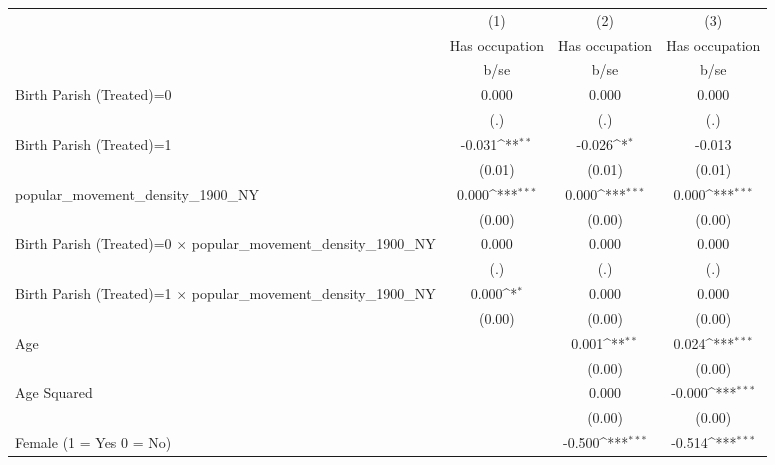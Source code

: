 {
\def\sym#1{\ifmmode^{#1}\else\(^{#1}\)\fi}
\begin{tabular}{l*{3}{c}}
\hline\hline
                    &\multicolumn{1}{c}{(1)}&\multicolumn{1}{c}{(2)}&\multicolumn{1}{c}{(3)}\\
                    &\multicolumn{1}{c}{Has occupation}&\multicolumn{1}{c}{Has occupation}&\multicolumn{1}{c}{Has occupation}\\
                    &        b/se         &        b/se         &        b/se         \\
\hline
Birth Parish (Treated)=0&       0.000         &       0.000         &       0.000         \\
                    &         (.)         &         (.)         &         (.)         \\
Birth Parish (Treated)=1&      -0.031\sym{**} &      -0.026\sym{*}  &      -0.013         \\
                    &      (0.01)         &      (0.01)         &      (0.01)         \\
popular\_movement\_density\_1900\_NY&       0.000\sym{***}&       0.000\sym{***}&       0.000\sym{***}\\
                    &      (0.00)         &      (0.00)         &      (0.00)         \\
Birth Parish (Treated)=0 $\times$ popular\_movement\_density\_1900\_NY&       0.000         &       0.000         &       0.000         \\
                    &         (.)         &         (.)         &         (.)         \\
Birth Parish (Treated)=1 $\times$ popular\_movement\_density\_1900\_NY&       0.000\sym{*}  &       0.000         &       0.000         \\
                    &      (0.00)         &      (0.00)         &      (0.00)         \\
Age                 &                     &       0.001\sym{**} &       0.024\sym{***}\\
                    &                     &      (0.00)         &      (0.00)         \\
Age Squared         &                     &       0.000         &      -0.000\sym{***}\\
                    &                     &      (0.00)         &      (0.00)         \\
Female (1 = Yes 0 = No)&                     &      -0.500\sym{***}&      -0.514\sym{***}\\

\end{tabular}}
